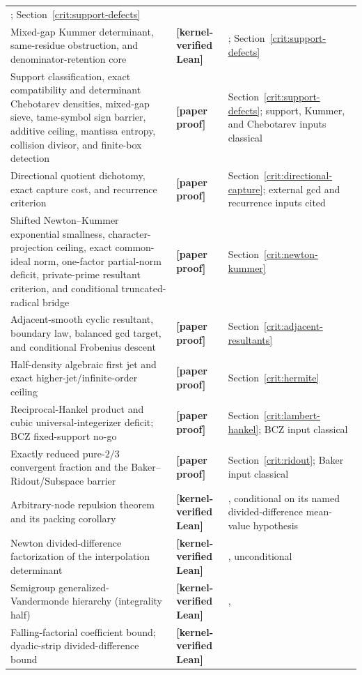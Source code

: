 \documentclass[11pt,oneside]{article}
\theoremstyle{definition}
\theoremstyle{remark}
\newcommand{\lean}[1]{\texttt{\detokenize{#1}}}
\newcommand{\statuslean}{\textcolor{leanblue}{\textbf{[kernel-verified Lean]}}}
\newcommand{\statusnew}{\textcolor{newgreen}{\textbf{[paper proof]}}}
\begin{document}
{\begin{longtable}{>{\raggedright\arraybackslash}p{}
                  >{\raggedright\arraybackslash}p{}
                  >{\raggedright\arraybackslash}p{}}
\lean{TwoStarContent}; Section~\ref{crit:support-defects} \\
Mixed-gap Kummer determinant, same-residue obstruction, and denominator-retention core &
\statuslean & \lean{MixedGapKummerFinite}; Section~\ref{crit:support-defects} \\
Support classification, exact compatibility and determinant Chebotarev densities,
mixed-gap sieve, tame-symbol sign barrier, additive ceiling, mantissa entropy,
collision divisor, and finite-box detection & \statusnew &
Section~\ref{crit:support-defects}; support, Kummer, and Chebotarev inputs classical \\
Directional quotient dichotomy, exact capture cost, and recurrence criterion &
\statusnew & Section~\ref{crit:directional-capture}; external gcd and recurrence inputs cited \\
Shifted Newton--Kummer exponential smallness, character-projection ceiling, exact common-ideal
norm, one-factor partial-norm deficit, private-prime resultant criterion, and conditional
truncated-radical bridge &
\statusnew & Section~\ref{crit:newton-kummer} \\
Adjacent-smooth cyclic resultant, boundary law, balanced gcd target, and conditional
Frobenius descent & \statusnew & Section~\ref{crit:adjacent-resultants} \\
Half-density algebraic first jet and exact higher-jet/infinite-order ceiling & \statusnew &
Section~\ref{crit:hermite} \\
Reciprocal-Hankel product and cubic universal-integerizer deficit; BCZ fixed-support no-go &
\statusnew & Section~\ref{crit:lambert-hankel}; BCZ input classical \\
Exactly reduced pure-$2/3$ convergent fraction and the Baker--Ridout/Subspace barrier &
\statusnew & Section~\ref{crit:ridout}; Baker input classical \\
Arbitrary-node repulsion theorem and its packing corollary & \statuslean &
\lean{ArbitraryNodeRepulsion}, conditional on its named divided-difference mean-value
hypothesis \\
Newton divided-difference factorization of the interpolation determinant & \statuslean &
\lean{ArbitraryNodeRepulsion}, unconditional \\
Semigroup generalized-Vandermonde hierarchy (integrality half) & \statuslean &
\lean{MixedExponentSemigroup}, \lean{SemigroupDeterminant} \\
Falling-factorial coefficient bound; dyadic-strip divided-difference bound & \statuslean &
\lean{FallingFactorialBound} \\

\end{longtable}}
\end{document}
